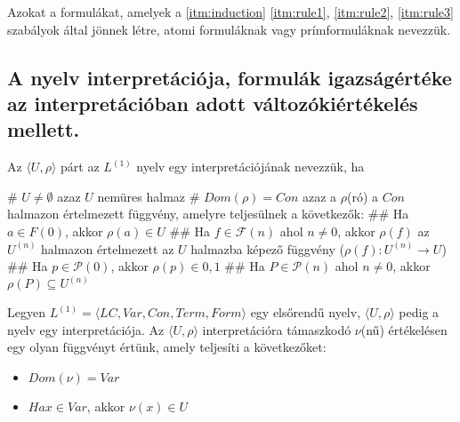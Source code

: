 \begin{note}
	Azokat a formulákat, amelyek a \ref{itm:induction} \ref{itm:rule1}, \ref{itm:rule2}, \ref{itm:rule3} szabályok által jönnek létre, atomi formuláknak vagy prímformuláknak nevezzük.
\end{note}

\subsection{A nyelv interpretációja, formulák igazságértéke az interpretációban adott változókiértékelés mellett.}
\begin{definition}
	Az $\langle U, \rho\rangle$ párt az $L^{(1)}$ nyelv egy interpretációjának nevezzük, ha
	\begin{easylist}
		# $U \neq \emptyset$ azaz $U$ nemüres halmaz
		# $Dom(\rho) = Con$ azaz a $\rho$(ró) a $Con$ halmazon értelmezett függvény, amelyre teljesülnek a következők:
		## Ha $a \in F(0)$, akkor $\rho(a) \in U$
		## Ha $f \in \mathcal{F}(n)$ ahol $n\neq 0$, akkor $\rho(f)$ az $U^{(n)}$ halmazon értelmezett az $U$ halmazba képező függvény ($\rho(f) : U^{(n)} \rightarrow U $)
		## Ha $p \in \mathcal{P}(0)$, akkor $\rho(p) \in {0, 1}$
		## Ha $P \in \mathcal{P}(n)$ ahol $n \neq 0$, akkor $\rho(P) \subseteq U^{(n)}$
	\end{easylist}
\end{definition}
\begin{definition}
	Legyen $L^{(1)} = \langle LC, Var, Con, Term, Form\rangle$ egy elsőrendű nyelv, $\langle U, \rho\rangle$ pedig a nyelv egy interpretációja. Az $\langle U, \rho\rangle$ interpretációra támaszkodó $\nu$(nű) értékelésen egy olyan függvényt értünk, amely teljesíti a következőket:
	\begin{itemize}
		\item  $ Dom(\nu) = Var $
		\item  $ Ha x \in Var$, akkor $\nu(x) \in U $
	\end{itemize}
\end{definition}
